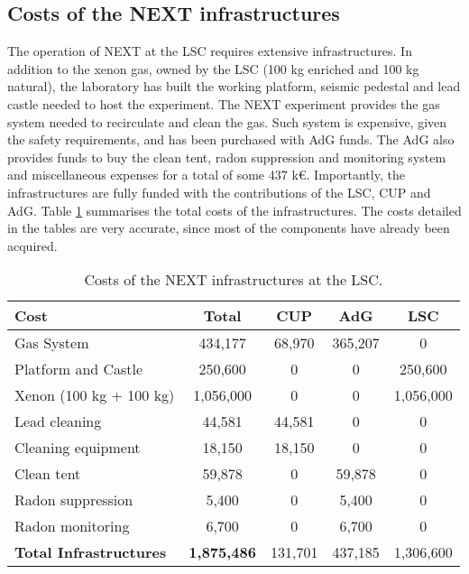 \subsection{Costs of the NEXT infrastructures}
The operation of NEXT at the LSC requires extensive infrastructures. In addition to the xenon gas, owned by the LSC (100 kg enriched and 100 kg natural), the laboratory has built the working platform, seismic pedestal and lead castle needed to host the experiment. The NEXT experiment provides the gas system needed to recirculate and clean the gas. Such system is expensive, given the safety requirements, and has been purchased with AdG funds. The AdG also provides funds to buy the clean tent, radon suppression and monitoring system and miscellaneous expenses for a total of some
437 k\euro. Importantly, the infrastructures are fully funded with the contributions of the LSC, CUP and AdG. 
Table \ref{tab.n100:INFRA} summarises the total costs of the infrastructures. The costs detailed in the tables are very accurate, since most of the components have already been acquired. 


  
\begin{table}[h!]
\begin{center}
\begin{tabular}{|l|c|c|c|c|}
\hline
 Cost &	Total& 	CUP & AdG &  LSC \\
 \hline
Gas System &	434,177 &	68,970 &	365,207 &	0 \\
Platform and Castle	& 250,600 & 	0	&0 &	250,600 \\
Xenon (100 kg + 100 kg)	& 1,056,000	& 0 &	0 & 1,056,000 \\
Lead cleaning	& 44,581 &44,581 &	0 & 0 \\
Cleaning equipment	& 18,150	& 18,150	& 0	& 0	\\
Clean tent	 & 59,878	&	0& 59,878 &	0	\\
Radon suppression 	& 5,400 &	0 &	5,400 &	0	\\
Radon monitoring &	6,700 &	0	& 6,700	& 0	\\
 \hline
{\bf Total Infrastructures} &	{\bf1,875,486}& 131,701& 437,185 & 1,306,600 \\	
 \hline\hline
\end{tabular}  
\caption{Costs of the NEXT infrastructures at the LSC.}
\label{tab.n100:INFRA}
\end{center}
\end{table} 

